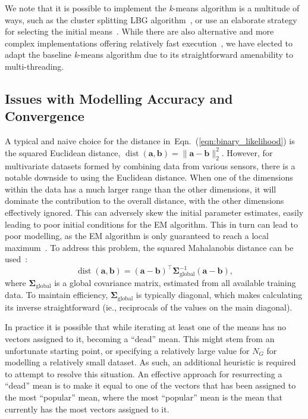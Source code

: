 \documentclass[10pt,a4paper]{article}
\def\Vec#1{{\boldsymbol{#1}}}
\def\Mat#1{{\boldsymbol{#1}}}
\begin{document}
We note that it is possible to implement the \mbox{{\it k}-means} algorithm is a multitude of ways,
such as the cluster splitting LBG algorithm~\cite{Linde80},
or use an elaborate strategy for selecting the initial means~\cite{Arthur_2007}.
While there are also alternative and more complex implementations offering relatively fast execution~\cite{Elkan_2003},
we have elected to adapt the baseline \mbox{{\it k}-means} algorithm due to its straightforward amenability to multi-threading. 



\subsection{Issues with Modelling Accuracy and Convergence}

A typical and naive choice for the distance in~Eqn.~(\ref{eqn:binary_likelihood})
is the squared Euclidean distance, \mbox{$\operatorname{dist}(\Vec{a}, \Vec{b}) = \| \Vec{a} - \Vec{b} \|^{2}_{2}$}.
However, for multivariate datasets formed by combining data from various sensors, there is a notable downside to using the Euclidean distance.
When one of the dimensions within the data has a much larger range than the other dimensions,
it will dominate the contribution to the overall distance, with the other dimensions effectively ignored.
This can adversely skew the initial parameter estimates, easily leading to poor initial conditions for the EM algorithm.
This in turn can lead to poor modelling, as the EM algorithm is only guaranteed to reach a local maximum~\cite{Dempster77,Duda01,Mitchell97}.
To address this problem, the squared Mahalanobis distance can be used~\cite{Bishop_2006,Duda01}:
%
\begin{equation}
\operatorname{dist}(\Vec{a}, \Vec{b}) = (\Vec{a} - \Vec{b})^\top \Mat{\Sigma}^{-1}_{\mathrm{global}} (\Vec{a} - \Vec{b}),
\end{equation}
\noindent where $\Mat{\Sigma}_{\mathrm{global}}$ is a global covariance matrix, estimated from all available training data.
To maintain efficiency, $\Mat{\Sigma}_{\mathrm{global}}$ is typically diagonal,
which makes calculating its inverse straightforward (ie., reciprocals of the values on the main diagonal).



In practice it is possible that while iterating at least one of the means has no vectors assigned to it,
becoming a ``dead'' mean.
This might stem from an unfortunate starting point, 
or specifying a relatively large value for $N_G$ for modelling a relatively small dataset.
As such, an additional heuristic is required to attempt to resolve this situation.
An effective approach for resurrecting a ``dead'' mean is to make it equal to one of the vectors
that has been assigned to the most ``popular'' mean,
where the most ``popular'' mean is the mean that currently has the most vectors assigned to it.
\end{document}
